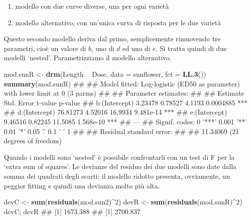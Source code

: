 \documentclass[a4paper,12pt,oneside]{book}
\providecommand{\tightlist}{%
  \setlength{\itemsep}{0pt}\setlength{\parskip}{0pt}}
\newenvironment{Shaded}{\begin{snugshade}}{\end{snugshade}}
\newcommand{\KeywordTok}[1]{\textcolor[rgb]{0.13,0.29,0.53}{\textbf{#1}}}
\newcommand{\DataTypeTok}[1]{\textcolor[rgb]{0.13,0.29,0.53}{#1}}
\newcommand{\DecValTok}[1]{\textcolor[rgb]{0.00,0.00,0.81}{#1}}
\newcommand{\StringTok}[1]{\textcolor[rgb]{0.31,0.60,0.02}{#1}}
\newcommand{\OperatorTok}[1]{\textcolor[rgb]{0.81,0.36,0.00}{\textbf{#1}}}
\newcommand{\NormalTok}[1]{#1}
\theoremstyle{definition}
\theoremstyle{definition}
\theoremstyle{definition}
\theoremstyle{remark}
\begin{document}
\begin{enumerate}
\def\labelenumi{\arabic{enumi}.}
\tightlist
\item
  modello con due curve diverse, una per ogni varietà
\item
  modello alternativo, con un'unica curva di risposta per le due varietà
\end{enumerate}

Questo secondo modello deriva dal primo, semplicemente rimuovendo tre
parametri, cioè un valore di \(b\), uno di \(d\) ed uno di \(e\). Si
tratta quindi di due modelli `nested'. Parametrizziamo il modello
alternativo.

\begin{Shaded}
\begin{Highlighting}[]
\NormalTok{mod.sunR <-}\StringTok{ }\KeywordTok{drm}\NormalTok{(Length }\OperatorTok{~}\StringTok{ }\NormalTok{Dose, }\DataTypeTok{data =}\NormalTok{ sunflower, }\DataTypeTok{fct =} \KeywordTok{LL.3}\NormalTok{())}
\KeywordTok{summary}\NormalTok{(mod.sunR)}
\NormalTok{## }
\NormalTok{## Model fitted: Log-logistic (ED50 as parameter) with lower limit at 0 (3 parms)}
\NormalTok{## }
\NormalTok{## Parameter estimates:}
\NormalTok{## }
\NormalTok{##               Estimate Std. Error t-value   p-value    }
\NormalTok{## b:(Intercept)  3.23478    0.78527  4.1193 0.0004885 ***}
\NormalTok{## d:(Intercept) 76.81273    4.52016 16.9934 9.481e-14 ***}
\NormalTok{## e:(Intercept)  9.46516    0.82245 11.5085 1.568e-10 ***}
\NormalTok{## ---}
\NormalTok{## Signif. codes:  0 '***' 0.001 '**' 0.01 '*' 0.05 '.' 0.1 ' ' 1}
\NormalTok{## }
\NormalTok{## Residual standard error:}
\NormalTok{## }
\NormalTok{##  11.34069 (21 degrees of freedom)}
\end{Highlighting}
\end{Shaded}

Quando i modelli sono `nested' è possibile confrontarli con un test di F
per la `extra sum of squares'. Le devianze del residuo dei due modelli
sono date dalla somma dei quadrati degli scarti: il modello ridotto
presenta, ovviamente, un peggior fitting e quindi una devianza molto più
alta.

\begin{Shaded}
\begin{Highlighting}[]
\NormalTok{devC <-}\StringTok{ }\KeywordTok{sum}\NormalTok{(}\KeywordTok{residuals}\NormalTok{(mod.sun2)}\OperatorTok{^}\DecValTok{2}\NormalTok{)}
\NormalTok{devR <-}\StringTok{ }\KeywordTok{sum}\NormalTok{(}\KeywordTok{residuals}\NormalTok{(mod.sunR)}\OperatorTok{^}\DecValTok{2}\NormalTok{)}
\NormalTok{devC; devR}
\NormalTok{## [1] 1673.388}
\NormalTok{## [1] 2700.837}
\end{Highlighting}
\end{Shaded}
\end{document}
